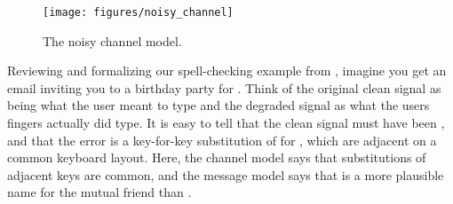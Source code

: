 

\begin{figure}
    \texttt{[image: figures/noisy\_channel]}
    \caption{The noisy channel model.}
    \label{noisy:channel}
\end{figure}


Reviewing and formalizing our spell-checking example from ,  imagine you get an
email inviting you to a birthday party for .  Think of the
original clean signal as being what the user meant to type and the
degraded signal as what the users fingers actually did type.  It is
easy to tell that the clean signal must have been , and that the error is a key-for-key substitution of 
for , which are adjacent on a common keyboard layout. Here, the channel model says that substitutions of adjacent
keys are common, and the message model says that  is a
more plausible name for the mutual friend than . 

